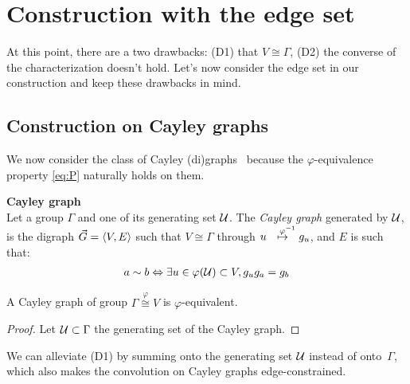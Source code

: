 \section{Construction with the edge set}

At this point, there are a two drawbacks: (D1) that $V \cong \Gamma$, (D2) the converse of the characterization doesn't hold. Let's now consider the edge set in our construction and keep these drawbacks in mind.

\subsection{Construction on Cayley graphs}

We now consider the class of Cayley (di)graphs~\citep{cayley1878desiderata,wiki:cayley} because the $\varphi$-equivalence property \eqref{eq:P} naturally holds on them.


\begin{definition}\textbf{Cayley graph}\\
Let a group $\Gamma$ and one of its generating set $\cu$. The \emph{Cayley graph} generated by $\cu$, is the digraph $\vgve$ such that $V \cong \Gamma$ through $u \overset{\h{9}\varphi^{-1}}{\mapsto} g_u$, and $E$ is such that:
\begin{gather*}
a \sim b \Leftrightarrow \exists u \in \varphi(\cu) \subset V, g_ug_a = g_b
\end{gather*}
\end{definition}

\begin{proposition}
A Cayley graph of group $\Gamma \overset{\varphi}{\cong} V$ is $\varphi$-equivalent.
\end{proposition}

\begin{proof}
Let $\cu \subset \Gamma$ the generating set of the Cayley graph.



\todo{}
\end{proof}

We can alleviate (D1) by summing onto the generating set $\cu$ instead of onto~$\Gamma$, which also makes the convolution on Cayley graphs edge-constrained.


